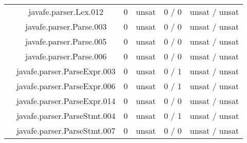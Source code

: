 \begin{table}[htbp]
\begin{minipage}{0.60\textwidth}
{\begin{tabular}[c]{c c!{\vrule width 1.5pt}c|c!{\vrule width 1.5pt}c|c|}
 			& javafe.parser.Lex.012    				      & 0    & unsat   & 0  / 0    & unsat / unsat  \\
 			& javafe.parser.Parse.003		  		      & 0    & unsat   & 0  / 0    & unsat / unsat  \\
 			& javafe.parser.Parse.005		   		      & 0    & unsat   & 0  / 0    & unsat / unsat  \\
 			& javafe.parser.Parse.006		   		      & 0    & unsat   & 0  / 0    & unsat / unsat  \\
 			& javafe.parser.ParseExpr.003		   		      & 0    & unsat   & 0  / 1    & unsat / unsat  \\
		 	& javafe.parser.ParseExpr.006	    			      & 0    & unsat   & 0  / 1    & unsat / unsat  \\
 			& javafe.parser.ParseExpr.014		   		      & 0    & unsat   & 0  / 0    & unsat / unsat  \\
		 	& javafe.parser.ParseStmt.004	    			      & 0    & unsat   & 0  / 1    & unsat / unsat  \\
		 	& javafe.parser.ParseStmt.007	    			      & 0    & unsat   & 0  / 0    & unsat / unsat  \\

\end{tabular}}
\end{minipage}
\end{table}
